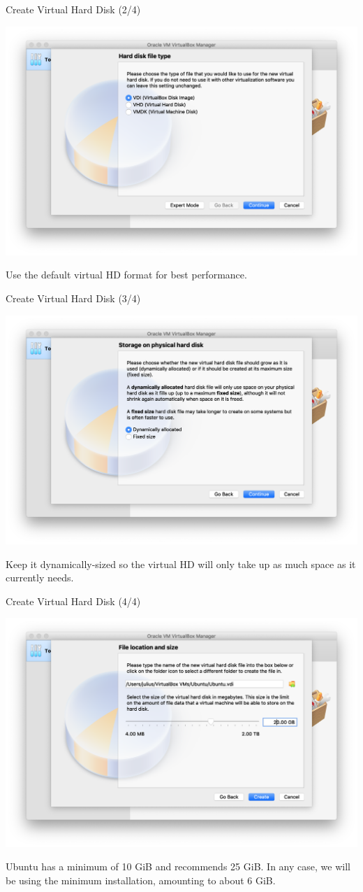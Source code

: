\documentclass[12pt]{beamer}
\begin{document}
\begin{frame}{Create Virtual Hard Disk (2/4)}
  \begin{center}
    \includegraphics[width=0.8\linewidth]{vb-hd2}
  \end{center}
  Use the default virtual HD format for best performance.
\end{frame}

\begin{frame}{Create Virtual Hard Disk (3/4)}
  \begin{center}
    \includegraphics[width=0.8\linewidth]{vb-hd3}
  \end{center}
  Keep it dynamically-sized so the virtual HD will only take up as much space as it currently needs.
\end{frame}

\begin{frame}{Create Virtual Hard Disk (4/4)}
  \begin{center}
    \includegraphics[width=0.8\linewidth]{vb-hd4}
  \end{center}
  Ubuntu has a minimum of 10 GiB and recommends 25 GiB. In any case, we will be using the minimum installation, amounting to about 6 GiB.
\end{frame}
\end{document}

